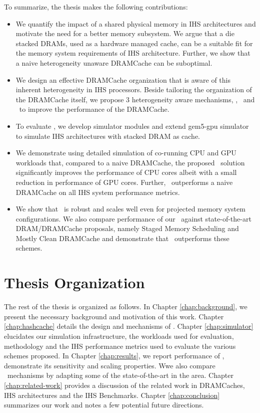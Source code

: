 \par To summarize, the thesis makes the following contributions:
\begin{itemize}
	\item We quantify the impact of a shared physical memory in IHS architectures and motivate the need for a better memory subsystem. We argue that a die stacked DRAMs, used as a hardware managed cache, can be a suitable fit for the memory system requirements of IHS architecture. Further, we show that a naive heterogeneity unaware DRAMCache can be suboptimal.
	\item We design an effective DRAMCache organization that is aware of this inherent heterogeneity in IHS processors. Beside tailoring the organization of the DRAMCache itself, we propose 3 heterogeneity aware mechanisms, \prioname, \bypassname\ and \chaining\ to improve the performance of the DRAMCache.
	\item To evaluate \cachename, we develop simulator modules and extend gem5-gpu simulator to simulate IHS architectures with stacked DRAM as cache.
	\item We demonstrate using detailed simulation of co-running CPU and GPU workloads that, compared to a naive DRAMCache, the proposed \cachename\ solution significantly improves the performance of CPU cores albeit with a small reduction in performance of GPU cores. Further, \cachename\ outperforms a naive DRAMCache on all IHS system performance metrics.
	\item We show that \cachename\ is robust and scales well even for projected memory system configurations. We also compare performance of our \cachename\ against state-of-the-art DRAM/DRAMCache proposals, namely Staged Memory Scheduling \cite{sms} and Mostly Clean DRAMCache \cite{mostly-clean} and demonstrate that \cachename\ outperforms these schemes.
\end{itemize}

\section{Thesis Organization}
The rest of the thesis is organized as follows. In Chapter \ref{chap:background}, we present the necessary background and motivation of this work. 
Chapter \ref{chap:hashcache} details the design and mechanisms of \cachename.
Chapter \ref{chap:simulator} elucidates our simulation infrastructure, the workloads used for evaluation, methodology and the IHS performance metrics used to evaluate the various schemes proposed. 
In Chapter \ref{chap:results}, we report performance of \cachename, demonstrate its sensitivity and scaling properties. Wwe also compare \cachename\ mechanisms by adapting some of the state-of-the-art in the area. Chapter \ref{chap:related-work} provides a discussion of the related work in DRAMCaches, IHS architectures and the IHS Benchmarks. Chapter \ref{chap:conclusion} summarizes our work and notes a few potential future directions.